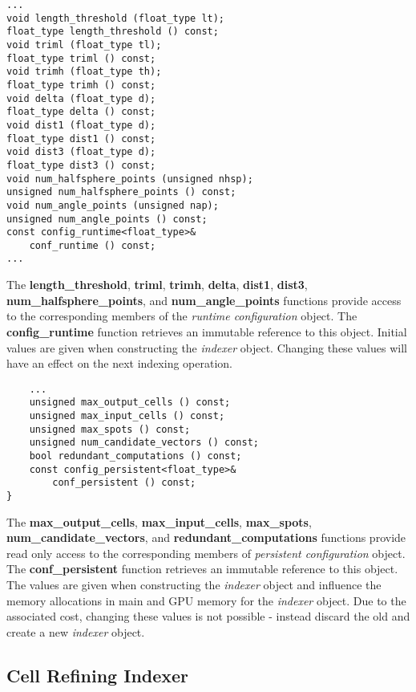\documentclass[a4paper,10pt]{article}
\begin{document}
\begin{lstlisting}
...
void length_threshold (float_type lt);
float_type length_threshold () const;
void triml (float_type tl);
float_type triml () const;
void trimh (float_type th);
float_type trimh () const;
void delta (float_type d);
float_type delta () const;
void dist1 (float_type d);
float_type dist1 () const;
void dist3 (float_type d);
float_type dist3 () const;
void num_halfsphere_points (unsigned nhsp);
unsigned num_halfsphere_points () const;
void num_angle_points (unsigned nap);
unsigned num_angle_points () const;
const config_runtime<float_type>&
    conf_runtime () const;
...
\end{lstlisting}

The \textbf{length\_threshold}, \textbf{triml}, \textbf{trimh}, \textbf{delta}, \textbf{dist1}, \textbf{dist3}, \textbf{num\_half\-sphe\-re\_points}, and \textbf{num\_angle\_points} functions provide access to the corresponding members of the \emph{runtime configuration} object. The \textbf{config\_runtime} function retrieves an immutable reference to this object. Initial values are given when constructing the \emph{indexer} object. Changing these values will have an effect on the next indexing operation.

\begin{lstlisting}
    ...
    unsigned max_output_cells () const;
    unsigned max_input_cells () const;
    unsigned max_spots () const;
    unsigned num_candidate_vectors () const;
    bool redundant_computations () const;
    const config_persistent<float_type>&
        conf_persistent () const;
}
\end{lstlisting}

The \textbf{max\_output\_cells}, \textbf{max\_input\_cells}, \textbf{max\_spots}, \textbf{num\_can\-di\-da\-te\_vec\-tors}, and \textbf{redundant\_computations} functions provide read only access to the corresponding members of \emph{persistent configuration} object. The \textbf{conf\_persistent} function retrieves an immutable reference to this object. The values are given when constructing the \emph{indexer} object and influence the memory allocations in main and GPU memory for the \emph{indexer} object. Due to the associated cost, changing these values is not possible - instead discard the old and create a new \emph{indexer} object.

\subsection{Cell Refining Indexer}
\end{document}
